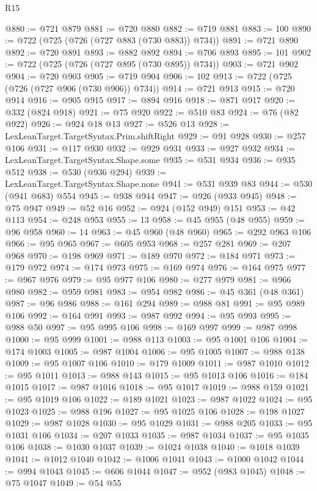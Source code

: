 \begin{lexlean}{R15}
\begin{coremodule}
@880 := @721 @879
@881 := @720 @880
@882 := @719 @881
@883 := 100
@890 := @722 (@725 (@726 (@727 @883 (@730 @883)) @734))
@891 := @721 @890
@892 := @720 @891
@893 := @882 @892
@894 := @706 @893
@895 := 101
@902 := @722 (@725 (@726 (@727 @895 (@730 @895)) @734))
@903 := @721 @902
@904 := @720 @903
@905 := @719 @904
@906 := 102
@913 := @722 (@725 (@726 (@727 @906 (@730 @906)) @734))
@914 := @721 @913
@915 := @720 @914
@916 := @905 @915
@917 := @894 @916
@918 := @871 @917
@920 := @332 (@824 @918)
@921 := @75 @920
@922 := @510 @83
@924 := @76 (@82 @922)
@926 := @924 @18 @13
@927 := @526 @13
@928 := LexLeanTarget.TargetSyntax.Prim.shiftRight
@929 := @91 @928
@930 := @257 @106
@931 := @117 @930
@932 := @929 @931
@933 := @927 @932
@934 := LexLeanTarget.TargetSyntax.Shape.some
@935 := @531 @934
@936 := @935 @512
@938 := @530 (@936 @294)
@939 := LexLeanTarget.TargetSyntax.Shape.none
@941 := @531 @939 @83
@944 := @530 (@941 @683) @554
@945 := @938 @944
@947 := @926 (@933 @945)
@948 := @75 @947
@949 := @52 @16
@952 := @924 (@152 @949) @151
@953 := @42 @113
@954 := @248 @953
@955 := 13
@958 := @45 @955 (@48 @955)
@959 := @96 @958
@960 := 14
@963 := @45 @960 (@48 @960)
@965 := @292 @963 @106
@966 := @95 @965
@967 := @605 @953
@968 := @257 @281
@969 := @207 @968
@970 := @198 @969
@971 := @189 @970
@972 := @184 @971
@973 := @179 @972
@974 := @174 @973
@975 := @169 @974
@976 := @164 @975
@977 := @967 @976
@979 := @95 @977 @106
@980 := @277 @979
@981 := @966 @980
@982 := @959 @981
@983 := @954 @982
@986 := @45 @361 (@48 @361)
@987 := @96 @986
@988 := @161 @294
@989 := @988 @81
@991 := @95 @989 @106
@992 := @164 @991
@993 := @987 @992
@994 := @95 @993
@995 := @988 @50
@997 := @95 @995 @106
@998 := @169 @997
@999 := @987 @998
@1000 := @95 @999
@1001 := @988 @113
@1003 := @95 @1001 @106
@1004 := @174 @1003
@1005 := @987 @1004
@1006 := @95 @1005
@1007 := @988 @138
@1009 := @95 @1007 @106
@1010 := @179 @1009
@1011 := @987 @1010
@1012 := @95 @1011
@1013 := @988 @143
@1015 := @95 @1013 @106
@1016 := @184 @1015
@1017 := @987 @1016
@1018 := @95 @1017
@1019 := @988 @159
@1021 := @95 @1019 @106
@1022 := @189 @1021
@1023 := @987 @1022
@1024 := @95 @1023
@1025 := @988 @196
@1027 := @95 @1025 @106
@1028 := @198 @1027
@1029 := @987 @1028
@1030 := @95 @1029
@1031 := @988 @205
@1033 := @95 @1031 @106
@1034 := @207 @1033
@1035 := @987 @1034
@1037 := @95 @1035 @106
@1038 := @1030 @1037
@1039 := @1024 @1038
@1040 := @1018 @1039
@1041 := @1012 @1040
@1042 := @1006 @1041
@1043 := @1000 @1042
@1044 := @994 @1043
@1045 := @606 @1044
@1047 := @952 (@983 @1045)
@1048 := @75 @1047
@1049 := @54 @55

\end{coremodule}
\end{lexlean}
